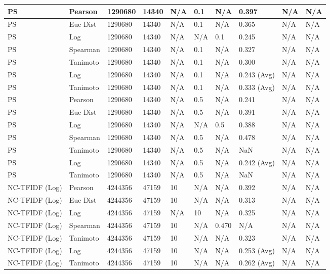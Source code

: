 \documentclass{article}
\begin{document}
\begin{longtable}{ |p{1.7cm}|p{1.9cm}|p{1.5cm}|p{1.5cm}|p{0.75cm}|p{0.75cm}|p{0.75cm}|p{0.75cm}|p{1.5cm}|p{1.5cm}|}
    PS & Pearson & 1290680 & 14340 & N/A & 0.1 & N/A & 0.397 & N/A & N/A  \\ \hline
    PS & Euc Dist & 1290680 & 14340 & N/A & 0.1 & N/A & 0.365 & N/A & N/A   \\ \hline
    PS & Log & 1290680 & 14340 & N/A &  N/A & 0.1 & 0.245 & N/A & N/A  \\ \hline
    PS  & Spearman & 1290680 & 14340 & N/A & 0.1 & N/A & 0.327 & N/A & N/A \\ \hline
    PS  & Tanimoto & 1290680 & 14340 & N/A & 0.1 & N/A & 0.300 & N/A & N/A \\ \hline
    PS  & Log & 1290680 & 14340 & N/A & 0.1 & N/A & 0.243 (Avg) & N/A & N/A \\ \hline
    PS  & Tanimoto & 1290680 & 14340 & N/A & 0.1 & N/A & 0.333 (Avg) & N/A & N/A \\ \hline
    
    PS & Pearson & 1290680 & 14340 & N/A & 0.5 & N/A & 0.241 & N/A & N/A  \\ \hline
    PS & Euc Dist & 1290680 & 14340 & N/A & 0.5 & N/A & 0.391 & N/A & N/A   \\ \hline
    PS & Log & 1290680 & 14340 & N/A &  N/A & 0.5 & 0.388 & N/A & N/A  \\ \hline
    PS & Spearman & 1290680 & 14340 & N/A & 0.5 & N/A & 0.478 & N/A & N/A \\ \hline
    PS & Tanimoto & 1290680 & 14340 & N/A & 0.5 & N/A & NaN & N/A & N/A \\ \hline
    PS & Log & 1290680 & 14340 & N/A & 0.5 & N/A & 0.242 (Avg) & N/A & N/A \\ \hline
    PS & Tanimoto & 1290680 & 14340 & N/A & 0.5 & N/A & NaN & N/A & N/A \\ \hline
    
    NC-TFIDF (Log) & Pearson & 4244356 & 47159 & 10 & N/A & N/A & 0.392 & N/A & N/A  \\ \hline
    NC-TFIDF (Log) & Euc Dist & 4244356 & 47159 & 10 & N/A & N/A & 0.313 & N/A & N/A   \\ \hline
    NC-TFIDF (Log) & Log & 4244356 & 47159 & N/A &  10 & N/A& 0.325 & N/A & N/A  \\ \hline
    NC-TFIDF (Log) & Spearman & 4244356 & 47159 & 10 & N/A & 0.470 & N/A & N/A & N/A \\ \hline
    NC-TFIDF (Log) & Tanimoto & 4244356 & 47159 & 10 & N/A& N/A & 0.323 & N/A & N/A \\ \hline
    NC-TFIDF (Log) & Log & 4244356 & 47159 & 10 & N/A& N/A & 0.253 (Avg) & N/A & N/A \\ \hline
    NC-TFIDF (Log) & Tanimoto & 4244356 & 47159 & 10 & N/A & N/A & 0.262 (Avg) & N/A & N/A \\ \hline
    

\end{longtable}
\end{document}
